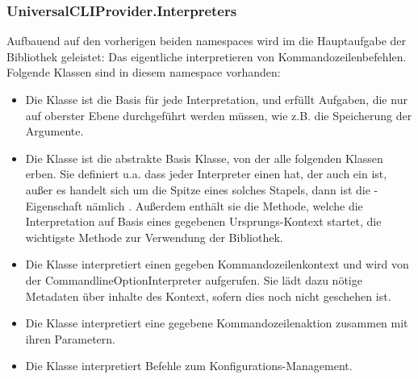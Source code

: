 \subsubsection{UniversalCLIProvider.Interpreters}
Aufbauend auf den vorherigen beiden namespaces wird im  die Hauptaufgabe der Bibliothek geleistet:
Das eigentliche interpretieren von Kommandozeilenbefehlen.
Folgende Klassen sind in diesem namespace vorhanden:
\begin{itemize}
 \item Die  Klasse ist die Basis für jede Interpretation, und erfüllt Aufgaben, die nur auf oberster Ebene durchgeführt werden müssen, wie z.B. die Speicherung der Argumente.
 \item Die  Klasse ist die abstrakte Basis Klasse, von der alle folgenden Klassen erben.
 Sie definiert u.a. dass jeder Interpreter einen  hat, der auch ein  ist, au\ss er es handelt sich um die Spitze eines solches Stapels,
 dann ist die -Eigenschaft nämlich .
 Au\ss erdem enthält sie die  Methode, welche die Interpretation auf Basis eines gegebenen Ursprungs-Kontext startet, die wichtigste Methode zur Verwendung der Bibliothek.
 \item Die  Klasse interpretiert einen gegeben Kommandozeilenkontext und wird von der CommandlineOptionInterpreter aufgerufen.
 Sie lädt dazu nötige Metadaten über inhalte des Kontext, sofern dies noch nicht geschehen ist.
 \item Die  Klasse interpretiert eine gegebene Kommandozeilenaktion zusammen mit ihren Parametern.
 \item Die  Klasse interpretiert Befehle zum Konfigurations-Management.
\end{itemize}
